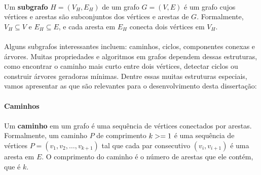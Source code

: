 \documentclass[12pt,a4paper]{article}
\def\geq{\string>=}%
\begin{document}
\paragraph{}Um \textbf{subgrafo} \(H = (V_H, E_H)\) de um grafo \(G = (V, E)\) é um grafo cujos vértices e arestas são subconjuntos dos vértices e arestas de \(G\). Formalmente, \(V_H \subseteq V\) e \(E_H \subseteq E\), e cada aresta em \(E_H\) conecta dois vértices em \(V_H\).

\paragraph{}
Alguns subgrafos interessantes incluem: caminhos, ciclos, componentes conexas e árvores. Muitas propriedades e algoritmos em grafos dependem dessas estruturas, como encontrar o caminho mais curto entre dois vértices, detectar ciclos ou construir árvores geradoras mínimas. Dentre essas muitas estruturas especiais, vamos apresentar as que são relevantes para o desenvolvimento desta dissertação:

\paragraph{Caminhos}
\paragraph{}Um \textbf{caminho} em um grafo é uma sequência de vértices conectados por arestas. Formalmente, um caminho \(P\) de comprimento \(k\geq 1\) é uma sequência de vértices \(P = (v_1, v_2, \ldots, v_{k+1})\) tal que cada par consecutivo \((v_i, v_{i+1})\) é uma aresta em \(E\). O comprimento do caminho é o número de arestas que ele contém, que é \(k\).
\end{document}
